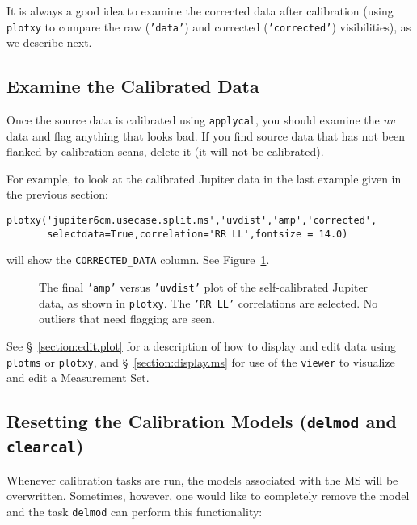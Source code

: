 It is always a good idea to examine the corrected data after calibration
(using {\tt plotxy} to compare the raw ({\tt 'data'}) and corrected 
({\tt 'corrected'}) visibilities), as we describe next.

\subsection{Examine the Calibrated Data}
\label{section:cal.correct.exam}

Once the source data is calibrated using {\tt applycal}, 
you should examine the $uv$ data and flag anything that looks bad.  If
you find source data that has not been flanked by calibration scans,
delete it (it will not be calibrated).  

For example, to look at the calibrated Jupiter data in the last
example given in the previous section:
\small
\begin{verbatim}
plotxy('jupiter6cm.usecase.split.ms','uvdist','amp','corrected',
       selectdata=True,correlation='RR LL',fontsize = 14.0)
\end{verbatim}
\normalsize
will show the {\tt CORRECTED\_DATA} column.  See 
Figure~\ref{fig:applycal_jupiter}.

\begin{figure}[h!]
\begin{center}
\caption{\label{fig:applycal_jupiter} The final {\tt 'amp'} versus
{\tt 'uvdist'} plot of the self-calibrated Jupiter data, as shown
in {\tt plotxy}.  The {\tt 'RR LL'} correlations are selected.
No outliers that need flagging are seen. }
\hrulefill
\end{center}
\end{figure}

See \S~\ref{section:edit.plot} for a description of how to display and edit 
data using {\tt plotms} or {\tt plotxy}, and \S~\ref{section:display.ms} for use of
the {\tt viewer} to visualize and edit a Measurement Set.

\subsection{Resetting the Calibration Models ({\tt delmod} and {\tt clearcal})}
\label{section:cal.correct.clearcal}

Whenever calibration tasks are run, the models associated with the MS
will be overwritten. Sometimes, however, one would like to completely
remove the model and the task {\tt delmod} can perform this
functionality:

